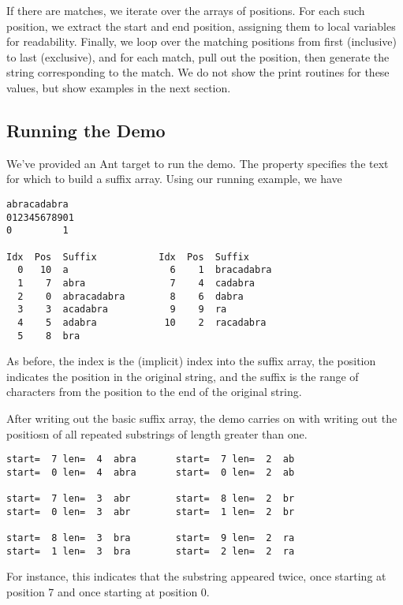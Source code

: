 If there are matches, we iterate over the arrays of positions.
For each such position, we extract the start and end position,
assigning them to local variables for readability.  Finally, we
loop over the matching positions from first (inclusive) to last
(exclusive), and for each match, pull out the position, then generate
the string corresponding to the match.  We do not show the print
routines for these values, but show examples in the next section.


\subsection{Running the Demo}

We've provided an Ant target  to run the demo.  
The property  specifies the text for which to build
a suffix array.  Using our running example, we have
%
\begin{verbatim}
abracadabra
012345678901
0         1

Idx  Pos  Suffix           Idx  Pos  Suffix
  0   10  a                  6    1  bracadabra
  1    7  abra               7    4  cadabra
  2    0  abracadabra        8    6  dabra
  3    3  acadabra           9    9  ra
  4    5  adabra            10    2  racadabra
  5    8  bra
\end{verbatim}
%
As before, the index is the (implicit) index into the
suffix array, the position indicates the position in the
original string, and the suffix is the range of characters
from the position to the end of the original string.

After writing out the basic suffix array, the demo carries on with
writing out the positiosn of all repeated substrings of length greater
than one.
%
\begin{verbatim}
start=  7 len=  4  abra       start=  7 len=  2  ab
start=  0 len=  4  abra       start=  0 len=  2  ab

start=  7 len=  3  abr        start=  8 len=  2  br
start=  0 len=  3  abr        start=  1 len=  2  br

start=  8 len=  3  bra        start=  9 len=  2  ra
start=  1 len=  3  bra        start=  2 len=  2  ra
\end{verbatim}
%
For instance, this indicates that the substring 
appeared twice, once starting at position 7 and once starting at
position 0.  

